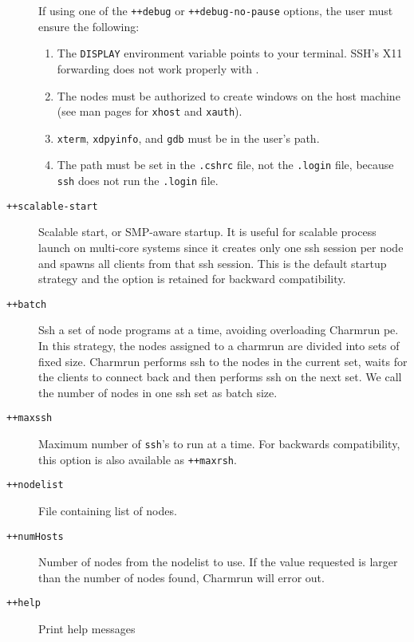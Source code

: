 \begin{description}
If using one of the {\tt ++debug} or {\tt ++debug-no-pause} options,
the user must ensure the following:
\begin{enumerate}

\item The {\tt DISPLAY} environment variable points to your terminal.
SSH's X11 forwarding does not work properly with \charmpp{}.

\item The nodes must be authorized to create windows on the host machine (see
man pages for {\tt xhost} and {\tt xauth}).

\item {\tt xterm}, {\tt xdpyinfo},  and {\tt gdb} must be in
the user's path.

\item The path must be set in the {\tt .cshrc} file, not the {\tt .login}
file, because {\tt ssh} does not run the {\tt .login} file.

\end{enumerate}

\item[{\tt ++scalable-start}]   Scalable start, or SMP-aware startup. It is useful for scalable process launch on multi-core systems since it creates only one ssh session per node and spawns all clients from that ssh session. This is the default startup strategy and the option is retained for backward compatibility.

\item[{\tt ++batch}]            Ssh a set of node programs at a time, avoiding overloading Charmrun pe.  In this strategy, the nodes assigned to a charmrun are divided into sets of fixed size. Charmrun performs ssh to the nodes in the current set, waits for the clients to connect back and then performs ssh on the next set. We call the number of nodes in one ssh set as batch size.

\item[{\tt ++maxssh}] Maximum number of {\tt ssh}'s to run at a
time. For backwards compatibility, this option is also available as {\tt ++maxrsh}.

\item[{\tt ++nodelist}] File containing list of nodes.

\item[{\tt ++numHosts}] Number of nodes from the nodelist to use. If the value requested is larger than the number of nodes found, Charmrun will error out.

\item[{\tt ++help}]             Print help messages


\end{description}
